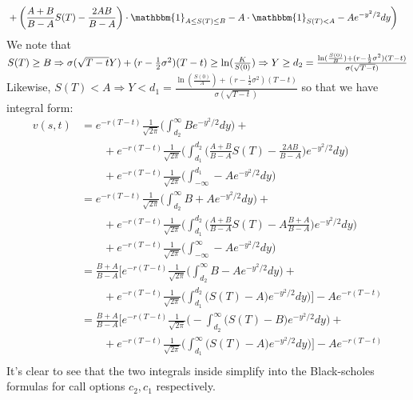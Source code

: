 \documentclass[12pt,twoside, letter]{exam}
\theoremstyle{definition}
\newcommand{\id}{\mathbbm{1}}
\begin{document}
\begin{enumerate}
\begin{solution}
\begin{align*}
            &+ \bigg(\frac{A+B}{B-A}S(T) - \frac{2AB}{B-A}\bigg)\cdot \id_{A \leq S(T) \leq B}
            - A \cdot \id_{S(T) < A} - A e^{-y^2/2} dy \bigg)
          \end{align*}
          We note that $S(T) \geq B \Rightarrow \sigma(\sqrt{T-t}Y) + (r- \frac{1}{2}\sigma^2)(T-t) \geq \ln(\frac{K}{S(0)}) \\
          \Rightarrow Y \geq d_2 = \frac{\ln(\frac{S(0)}{B}) + (r- \frac{1}{2}\sigma^2)(T-t)}{\sigma(\sqrt{T-t})}$ \\
          Likewise, $S(T) < A \Rightarrow Y < d_1 = \frac{\ln(\frac{S(0)}{A}) + (r- \frac{1}{2}\sigma^2)(T-t)}{\sigma(\sqrt{T-t})}$ so that
          we have integral form:
          \begin{align*}
            v(s,t) &= e^{-r(T-t)}\frac{1}{\sqrt{2\pi}}\bigg(\int^{\infty}_{d_2} B e^{-y^2/2} dy \bigg) + \\
            &\qquad + e^{-r(T-t)}\frac{1}{\sqrt{2\pi}}\bigg(\int^{d_2}_{d_1} \bigg(\frac{A+B}{B-A}S(T) - \frac{2AB}{B-A}\bigg) e^{-y^2/2} dy \bigg)\\
            &\qquad + e^{-r(T-t)}\frac{1}{\sqrt{2\pi}}\bigg(\int^{d_1}_{-\infty} -A e^{-y^2/2} dy \bigg) \\
            &= e^{-r(T-t)}\frac{1}{\sqrt{2\pi}}\bigg(\int^{\infty}_{d_2} B+A e^{-y^2/2} dy \bigg) + \\
            &\qquad+ e^{-r(T-t)}\frac{1}{\sqrt{2\pi}}\bigg(\int^{d_2}_{d_1} \bigg(\frac{A+B}{B-A}S(T) - A\frac{B+A}{B-A}\bigg) e^{-y^2/2} dy \bigg)\\
            &\qquad+ e^{-r(T-t)}\frac{1}{\sqrt{2\pi}}\bigg(\int^{\infty}_{-\infty} -A e^{-y^2/2} dy \bigg) \\
            &= \frac{B+A}{B-A} \bigg[e^{-r(T-t)}\frac{1}{\sqrt{2\pi}}\bigg(\int^{\infty}_{d_2} B-A e^{-y^2/2} dy \bigg) + \\
            &\qquad+ e^{-r(T-t)}\frac{1}{\sqrt{2\pi}}\bigg(\int^{d_2}_{d_1} \bigg(S(T) - A\bigg) e^{-y^2/2} dy \bigg)\bigg] - Ae^{-r(T-t)}\\
            &= \frac{B+A}{B-A} \bigg[e^{-r(T-t)}\frac{1}{\sqrt{2\pi}}\bigg(-\int^{\infty}_{d_2}  \bigg(S(T) - B\bigg)e^{-y^2/2} dy \bigg) + \\
            &\qquad+ e^{-r(T-t)}\frac{1}{\sqrt{2\pi}}\bigg(\int^{\infty}_{d_1} \bigg(S(T) - A\bigg) e^{-y^2/2} dy \bigg)\bigg] - Ae^{-r(T-t)}\\
          \end{align*}
          It's clear to see that the two integrals inside simplify into the Black-scholes formulas for call options $c_2, c_1$ respectively.
        \end{solution}
    \end{enumerate}
\end{document}
